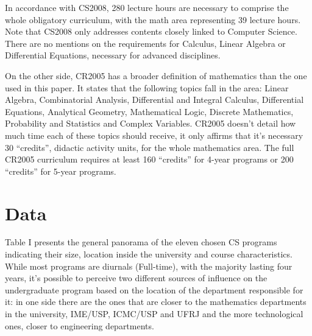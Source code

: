 \documentclass[conference]{IEEEtran}
\begin{document}
	In accordance with CS2008, 280 lecture hours are necessary to comprise the whole obligatory curriculum, with the math area representing 39 lecture hours. \cite{cs2008} Note that CS2008 only addresses contents closely linked to Computer Science. There are no mentions on the requirements for Calculus, Linear Algebra or Differential Equations, necessary for advanced disciplines.

	On the other side, CR2005 has a broader definition of mathematics than the one used in this paper. It states that the following topics fall in the area: Linear Algebra, Combinatorial Analysis, Differential and Integral Calculus, Differential Equations, Analytical Geometry, Mathematical Logic, Discrete Mathematics, Probability and Statistics and Complex Variables. CR2005 doesn't detail how much time each of these topics should receive, it only affirms that it's necessary 30 ``credits'', didactic activity units, for the whole mathematics area. The full CR2005 curriculum requires at least 160 ``credits'' for 4-year programs or 200 ``credits'' for 5-year programs.

\section{Data}
	Table I presents the general panorama of the eleven chosen CS programs indicating their size, location inside the university and course characteristics. While most programs are diurnals (Full-time), with the majority lasting four years, it's possible to perceive two different sources of influence on the undergraduate program based on the location of the department responsible for it: in one side there are the ones that are closer to the mathematics departments in the university, IME/USP, ICMC/USP and UFRJ and the more technological ones, closer to engineering departments.
\end{document}
